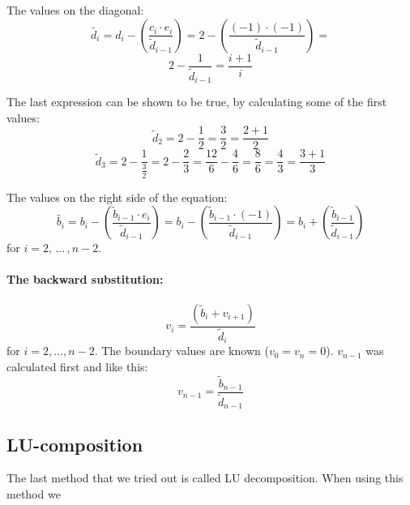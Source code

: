 \hspace{1cm}\linebreak
The values on the diagonal:
\[
\tilde{d_i} =  d_i - \left(\frac{c_i \cdot e_i}{\tilde{d}_{i-1}}\right) = 2 - \left(\frac{(-1) \cdot (-1)}{\tilde{d}_{i-1}}\right) = 
\]
\[
2 - \frac{1}{\tilde{d}_{i-1}} =  \frac{i + 1}{i}
\]

The last expression can be shown to be true, by calculating some of the first values:
\[
\tilde{d}_2 = 2 - \frac{1}{2} = \frac{3}{2} = \frac{2 + 1}{2}
\]
\[
\tilde{d}_3 = 2 - \frac{1}{\frac{3}{2}} = 2 - \frac{2}{3} = \frac{12}{6} - \frac{4}{6} = \frac{8}{6} = \frac{4}{3} = \frac{3+1}{3}
\]

The values on the right side of the equation:
\[
\tilde{b_i} =  b_i - \left(\frac{\tilde{b}_{i-1} \cdot e_i}{\tilde{d}_{i-1}}\right) = b_i - \left(\frac{\tilde{b}_{i-1} \cdot (-1)}{\tilde{d}_{i-1}}\right) = b_i + \left(\frac{\tilde{b}_{i-1}}{\tilde{d}_{i-1}}\right)
\]
for $i = 2,\, \dots\, , n-2 $.

\paragraph{The backward substitution:\hspace{4cm}}

\hspace{1cm}\linebreak
\[
v_i = \frac{\left(\tilde{b}_i + v_{i+1}\right)}{\tilde{d}_i}
\]
for $i = 2, \dots, n-2 $. The boundary values are known ($v_0 = v_n = 0$). $v_{n-1}$ was calculated first and like this:
\[
v_{n-1} = \frac{\tilde{b}_{n-1}}{\tilde{d}_{n-1}}
\]

\subsection{LU-composition}

The last method that we tried out is called LU decomposition. When using this method we 